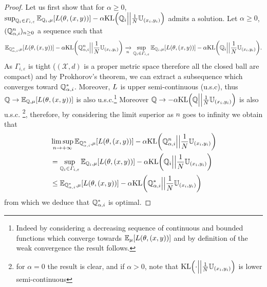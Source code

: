 \begin{proof}
Let us first show that for $\alpha\geq 0$, $\sup_{\QQ_i\in\Gamma_{i,\varepsilon}}\mathbb{E}_{\QQ_i,\mu}\left[\loss(\theta,(x,y))\right]-\alpha\text{KL}\left(\QQ_i\Big|\Big|\frac{1}{\numsamples}\mathbb{U}_{(x_i,y_i)}\right)$ admits a solution. Let $\alpha\geq 0$,
$(\mathbb{Q}_{\alpha,i}^{n})_{n\geq 0}$ a sequence such that
\begin{align*}
  \mathbb{E}_{\QQ_{\alpha,i}^{n},\mu}\left[\loss(\theta,(x,y))\right]-\alpha\text{KL}\left(\QQ_{\alpha,i}^{n}\Big|\Big|\frac{1}{\numsamples}\mathbb{U}_{(x_i,y_i)}\right)\xrightarrow[n]{} \sup_{\QQ_i\in\Gamma_{i,\varepsilon}}\mathbb{E}_{\QQ_i,\mu}\left[\loss(\theta,(x,y))\right]-\alpha\text{KL}\left(\QQ_i\Big|\Big|\frac{1}{\numsamples}\mathbb{U}_{(x_i,y_i)}\right).
\end{align*}
As $\Gamma_{i,\varepsilon}$ is tight ($(\mathcal{X},d)$ is a proper metric space therefore all the closed ball are compact) and by Prokhorov's theorem, we can extract a subsequence which converges  toward  $\mathbb{Q}^{*}_{\alpha,i}$. Moreover, $L$ is upper semi-continuous (u.s.c), thus $\QQ\rightarrow \mathbb{E}_{\QQ,\mu}\left[\loss(\theta,(x,y))\right]$ is also u.s.c.\footnote{Indeed by considering a decreasing sequence of continuous and bounded functions which converge towards $\mathbb{E}_{\mu}\left[\loss(\theta,(x,y))\right]$ and by definition of the weak convergence the result follows.} Moreover 
$\QQ\rightarrow - \alpha \text{KL}\left(\QQ\Big|\Big|\frac{1}{\numsamples}\mathbb{U}_{(x_i,y_i)}\right)$ is also u.s.c. \footnote{for $\alpha=0$ the result is clear, and if $\alpha>0$, note that $\text{KL}\left(\cdot\Big|\Big|\frac{1}{\numsamples}\mathbb{U}_{(x_i,y_i)}\right)$ is lower semi-continuous}, therefore, by considering the limit superior as $n$ goes to infinity we obtain that
\begin{align*}
    &\limsup_{n\to+\infty}\mathbb{E}_{\QQ_{\alpha,i}^{n},\mu}\left[\loss(\theta,(x,y))\right]-\alpha\text{KL}\left(\QQ_{\alpha,i}^{n}\Big|\Big|\frac{1}{\numsamples}\mathbb{U}_{(x_i,y_i)}\right)\\
    &=\sup_{\QQ_i\in\Gamma_{i,\varepsilon}}\mathbb{E}_{\QQ_i,\mu}\left[\loss(\theta,(x,y))\right]-\alpha\text{KL}\left(\QQ_i\Big|\Big|\frac{1}{\numsamples}\mathbb{U}_{(x_i,y_i)}\right)\\
    &\leq \mathbb{E}_{\QQ_{\alpha,i}^{*},\mu}\left[\loss(\theta,(x,y))\right]-\alpha\text{KL}\left(\QQ_{\alpha,i}^{*}\Big|\Big|\frac{1}{\numsamples}\mathbb{U}_{(x_i,y_i)}\right)
\end{align*}
from which we deduce that $\mathbb{Q}_{\alpha,i}^{*}$ is optimal.


\end{proof}
